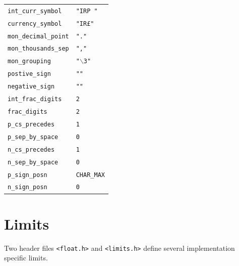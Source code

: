    \begin{tabular}{lp{\textwidth}}
     \texttt{int\_curr\_symbol} & \texttt{"IRP "}
    \\

     \texttt{currency\_symbol} & \texttt{"IR\pounds"}
    \\

     \texttt{mon\_decimal\_point} & \texttt{"."}
    \\

     \texttt{mon\_thousands\_sep} & \texttt{","}
    \\

     \texttt{mon\_grouping} & \texttt{"$\backslash$3"}
    \\

     \texttt{postive\_sign} & \texttt{""}
    \\

     \texttt{negative\_sign} & \texttt{""}
    \\

     \texttt{int\_frac\_digits} & \texttt{2}
    \\

     \texttt{frac\_digits} & \texttt{2}
    \\

     \texttt{p\_cs\_precedes} & \texttt{1}
    \\

     \texttt{p\_sep\_by\_space} & \texttt{0}
    \\

     \texttt{n\_cs\_precedes} & \texttt{1}
    \\

     \texttt{n\_sep\_by\_space} & \texttt{0}
    \\

     \texttt{p\_sign\_posn} & \texttt{CHAR\_MAX}
    \\

     \texttt{n\_sign\_posn} & \texttt{0}
    \\
\end{tabular}


  

 
        \section{Limits}
        

  

  Two header files \texttt{<float.h>} and
   \texttt{<limits.h>} define several implementation specific
   limits.


